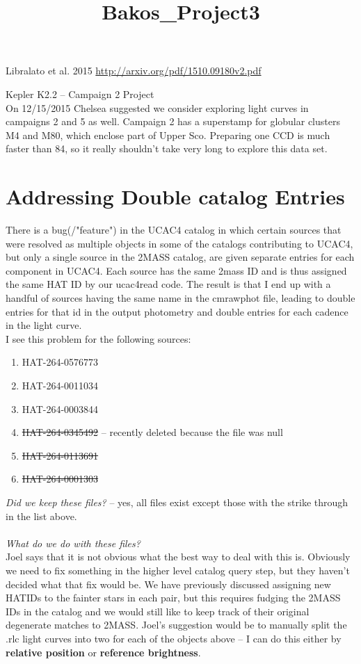 \documentclass[11pt,letterpaper]{book} %
\begin{document}
Libralato et al. 2015 \url{http://arxiv.org/pdf/1510.09180v2.pdf}

\pagebreak
\title{Bakos_Project3}
{\Huge Kepler K2.2 -- Campaign 2 Project}\\[5mm]
On 12/15/2015 Chelsea suggested we consider exploring light curves in campaigns 2 and 5 as well. Campaign 2 has a superstamp for globular clusters M4 and M80, which enclose part of Upper Sco. Preparing one CCD is much faster than 84, so it really shouldn't take very long to explore this data set. 


\chapter*{Addressing Double catalog Entries}
There is a bug(/"feature") in the UCAC4 catalog in which certain sources that were resolved as multiple objects in some of the catalogs contributing to UCAC4, but only a single source in the 2MASS catalog, are given separate entries for each component in UCAC4. Each source has the same 2mass ID and is thus assigned the same HAT ID by our ucac4read code. The result is that I end up with a handful of sources having the same name in the cmrawphot file, leading to double entries for that id in the output photometry and double entries for each cadence in the light curve. \\ 
I see this problem for the following sources:
\begin{enumerate}
\item HAT-264-0576773
\item HAT-264-0011034
\item HAT-264-0003844
\item \sout{HAT-264-0345492} -- recently deleted because the file was null
\item \sout{HAT-264-0113691}
\item \sout{HAT-264-0001303}
\end{enumerate}

\textit{Did we keep these files?} -- yes, all files exist except those with the strike through in the list above. \\ \\
\textit{What do we do with these files?}\\
Joel says that it is not obvious what the best way to deal with this is. 
Obviously we need to fix something in the higher level catalog query step, but they haven't decided what that fix would be. 
We have previously discussed assigning new HATIDs to the fainter stars in each pair, but this requires fudging the 2MASS IDs in the catalog and we would still like to keep track of their original degenerate matches to 2MASS.  
Joel's suggestion would be to manually split the .rlc light curves into two for each of the objects above -- I can do this either by \textbf{relative position} or \textbf{reference brightness}.
\end{document}
